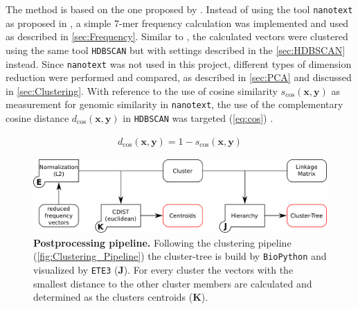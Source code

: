 \vspace{1em}

The method is based on the one proposed by \textcite{viehweger_addressing_2019}. Instead of using the tool \texttt{nanotext} as proposed in \textcite{viehweger_encoding_2019}, a simple 7-mer frequency calculation was implemented and used as described in \autoref{sec:Frequency}. Similar to \textcite{viehweger_addressing_2019}, the calculated vectors were clustered using the same tool \texttt{HDBSCAN} but with settings described in the \autoref{sec:HDBSCAN} instead. Since \texttt{nanotext} was not used in this project, different types of dimension reduction were performed and compared, as described in \autoref{sec:PCA} and discussed in \autoref{sec:Clustering}. With reference to the use of cosine similarity $s_{\text{cos}}(\mathbf{x}, \mathbf{y})$ as measurement for genomic similarity in \texttt{nanotext}, the use of the complementary cosine distance $d_{\text{cos}}(\mathbf{x}, \mathbf{y})$ in \texttt{HDBSCAN} was targeted (\autoref{eq:cos}) \autocite{viehweger_encoding_2019}. %

\begin{equation}\label{eq:cos}
    \begin{aligned}
        d_{\text{cos}}(\mathbf{x}, \mathbf{y}) = 1 - s_{\text{cos}}(\mathbf{x}, \mathbf{y})
    \end{aligned}
\end{equation}

\begin{figure}[!hbt]
    \centering
    \includegraphics[width=\textwidth]{Graphics/Tree.pdf}
    \caption[Postprocessing pipeline]{\textbf{Postprocessing pipeline.} Following the clustering pipeline (\autoref{fig:Clustering_Pipeline}) the cluster-tree is build by \texttt{BioPython} and visualized by \texttt{ETE3} (\textsf{\textbf{J}}). For every cluster the vectors with the smallest distance to the other cluster members are calculated and determined as the clusters centroids (\textsf{\textbf{K}}).}
    \label{fig:Tree_Pipeline}
\end{figure}

